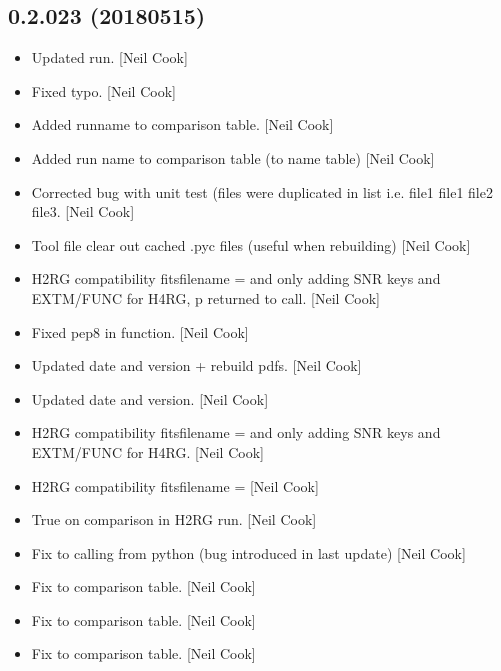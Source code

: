 \documentclass[a4paper,10pt,english]{report}
\begin{document}
\subsection{0.2.023 (2018\sphinxhyphen{}05\sphinxhyphen{}15)}
\label{\detokenize{misc/changelog:id457}}\begin{itemize}
\item {} 
Updated run. {[}Neil Cook{]}

\item {} 
Fixed typo. {[}Neil Cook{]}

\item {} 
Added runname to comparison table. {[}Neil Cook{]}

\item {} 
Added run name to comparison table (to name table) {[}Neil Cook{]}

\item {} 
Corrected bug with unit test (files were duplicated in list i.e. file1
file1 file2 file3. {[}Neil Cook{]}

\item {} 
Tool file \sphinxhyphen{} clear out cached .pyc files (useful when rebuilding) {[}Neil
Cook{]}

\item {} 
H2RG compatibility \sphinxhyphen{} fitsfilename =  and only adding
SNR keys and EXTM/FUNC for H4RG, p returned to call. {[}Neil Cook{]}

\item {} 
Fixed pep8 in  function. {[}Neil Cook{]}

\item {} 
Updated date and version + rebuild pdfs. {[}Neil Cook{]}

\item {} 
Updated date and version. {[}Neil Cook{]}

\item {} 
H2RG compatibility \sphinxhyphen{} fitsfilename =  and only adding
SNR keys and EXTM/FUNC for H4RG. {[}Neil Cook{]}

\item {} 
H2RG compatibility \sphinxhyphen{} fitsfilename =  {[}Neil Cook{]}

\item {} 
True on comparison in H2RG run. {[}Neil Cook{]}

\item {} 
Fix to calling from python (bug introduced in last update) {[}Neil Cook{]}

\item {} 
Fix to  comparison table. {[}Neil Cook{]}

\item {} 
Fix to  comparison table. {[}Neil Cook{]}

\item {} 
Fix to  comparison table. {[}Neil Cook{]}

\end{itemize}
\end{document}
